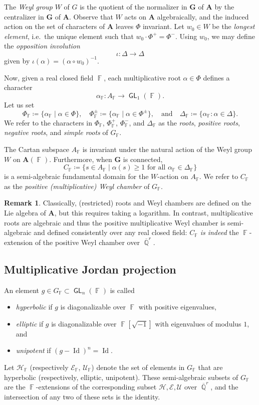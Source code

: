 \documentclass{amsart}
\theoremstyle{plain}
\theoremstyle{definition}
\newtheorem{remark}[proposition]{Remark}
\DeclareMathOperator{\Id}{Id}
\DeclareMathOperator{\GL}{\mathsf{GL}}
\DeclareMathOperator{\Fb}{{\mathbb{F}}}
\DeclareMathOperator{\Qb}{\mathbb{Q}}
\newcommand{\1}{\mathbf{1}}
\begin{document}
The \emph{Weyl group} $W$ of $G$ is the quotient of the normalizer in $\mathbf G$ of $\mathbf A$ by the centralizer in $\mathbf G$ of $\mathbf A$. Observe that $W$ acts on $\mathbf A$ algebraically, and the induced action on the set of characters of $\mathbf A$ leaves $\Phi$ invariant. Let $w_0\in W$ be the \emph{longest element}, i.e.\ the unique element such that  $w_0\cdot\Phi^+=\Phi^-$. Using $w_0$, we may define the \emph{opposition involution} \[\iota:\Delta\to\Delta\]
given by $\iota(\alpha)=(\alpha\circ w_0)^{-1}$. 

Now, given a real closed field $\Fb$, each multiplicative root $\alpha\in\Phi$ defines a character
\[\alpha_{\Fb}:A_{\Fb} \to\GL_1(\Fb).\]
Let us set
\[\Phi_{\Fb}\coloneqq \{\alpha_{\Fb}\mid\alpha\in\Phi\},\quad\Phi_{\Fb}^\pm\coloneqq\{\alpha_{\Fb}\mid\alpha\in\Phi^\pm\},\quad\text{and}\quad\Delta_{\Fb}\coloneqq\{\alpha_{\Fb}:\alpha\in\Delta\}.\]
We refer to the characters in $\Phi_{\Fb}$, $\Phi_{\Fb}^+$, $\Phi_{\Fb}^-$, and $\Delta_{\Fb}$ as the \emph{roots}, \emph{positive roots}, \emph{negative roots}, and \emph{simple roots} of $G_{\Fb}$. 

The Cartan subspace $A_{\Fb}$ is invariant under the natural action of the Weyl group $W$ on $\mathbf A(\Fb)$. Furthermore, when $\mathbf{G}$ is connected, 
\[C_{\Fb}\coloneqq \{s\in A_{\Fb}\mid\alpha(s)\ge 1\text{ for all }\alpha_{\Fb}\in\Delta_{\Fb}\}\]
is a semi-algebraic fundamental domain for the $W$-action on $A_{\Fb}$. We refer to $C_{\Fb}$ as the \emph{positive (multiplicative) Weyl chamber} of $G_{\Fb}$.

\begin{remark}
    Classically, (restricted) roots and Weyl chambers are defined on the Lie algebra of $\mathbf A$, but this requires taking a logarithm. In contrast, multiplicative roots are algebraic and thus the positive multiplicative Weyl chamber is semi-algebraic and defined consistently over any real closed field: $C_{\Fb}$ \emph{is indeed} the $\Fb$-extension of the positive Weyl chamber over $\overline{\Qb}^r$. 
\end{remark}
 

\subsection{Multiplicative Jordan projection}
\label{section: Jordan projection}
An element $g\in G_{\Fb} \subset \GL_n(\Fb)$ is called
\begin{itemize}
    \item \emph{hyperbolic} if $g$ is diagonalizable over $\Fb$ with positive eigenvalues,
    \item \emph{elliptic} if $g$ is diagonalizable over $\Fb[\sqrt{-1}]$ with eigenvalues of modulus $1$, and
    \item \emph{unipotent} if $(g-\Id)^n=\Id$. 
\end{itemize} Let $\mathcal H_{\Fb}$ (respectively $\mathcal E_{\Fb}$, $\mathcal U_{\Fb}$) denote the set of elements in $G_{\Fb}$ that are hyperbolic (respectively, elliptic, unipotent). These semi-algebraic subsets of $G_{\Fb}$ are the $\Fb$-extensions of the corresponding subset $\mathcal H, \mathcal E, \mathcal U$ over $\overline{\Qb}^r$, and the intersection of any two of these sets is the identity.
\end{document}
